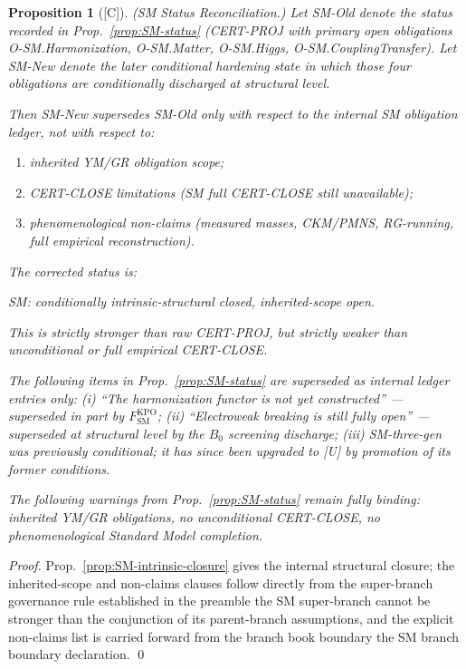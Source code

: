 \documentclass[12pt,oneside]{amsbook}
\theoremstyle{plain}
\newtheorem{proposition}[theorem]{Proposition}
\theoremstyle{definition}
\theoremstyle{remark}
\newcommand{\status}[1]{\textup{[#1]}}
\begin{document}
\begin{proposition}[\status{C}]\label{prop:SM-status-reconciliation}
\textup{(SM Status Reconciliation.)}
Let SM-Old denote the status recorded in
Prop.~\ref{prop:SM-status} (CERT-PROJ with primary open obligations
O-SM.Harmonization, O-SM.Matter, O-SM.Higgs, O-SM.CouplingTransfer).
Let SM-New denote the later conditional hardening state in which those
four obligations are conditionally discharged at structural level.

Then SM-New supersedes SM-Old \emph{only with respect to} the
internal SM obligation ledger, not with respect to:
\begin{enumerate}[label=\textup{(\arabic*)}]
 \item inherited YM/GR obligation scope;
 \item CERT-CLOSE limitations (SM full CERT-CLOSE still unavailable);
 \item phenomenological non-claims (measured masses, CKM/PMNS,
 RG-running, full empirical reconstruction).
\end{enumerate}
The corrected status is:
\begin{center}
SM: \emph{conditionally intrinsic-structural closed,
inherited-scope open.}
\end{center}
This is strictly stronger than raw CERT-PROJ, but strictly weaker than
unconditional or full empirical CERT-CLOSE.

The following items in Prop.~\ref{prop:SM-status} are superseded
\emph{as internal ledger entries only}:
(i) ``The harmonization functor is not yet constructed'' ---
superseded in part by $F_{\mathrm{SM}}^{\mathrm{KPO}}$;
(ii) ``Electroweak breaking is still fully open'' ---
superseded at structural level by the $B_0$ screening discharge;
(iii) SM-three-gen was previously conditional; it has since been
upgraded to [U] by promotion of its former conditions.

The following warnings from Prop.~\ref{prop:SM-status} remain
fully binding: inherited YM/GR obligations, no unconditional
CERT-CLOSE, no phenomenological Standard Model completion.
\end{proposition}

\begin{proof}
Prop.~\ref{prop:SM-intrinsic-closure} gives the internal structural
closure; the inherited-scope and non-claims clauses follow directly
from the super-branch governance rule established in the preamble
the SM super-branch cannot be stronger than
the conjunction of its parent-branch assumptions, and the explicit
non-claims list is carried forward from the branch book boundary
the SM branch boundary declaration.
\qed
\end{proof}
\end{document}
